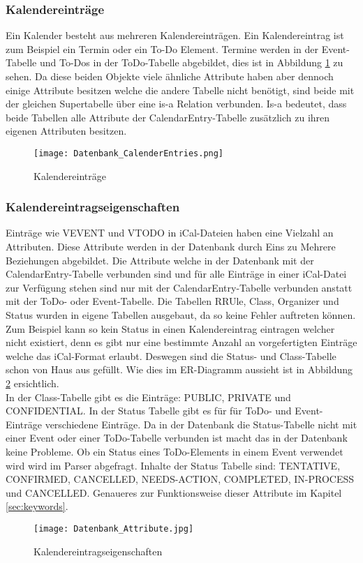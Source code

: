 \subsubsection*{Kalendereinträge}
\label{ref:kalenderEintraege}
Ein Kalender besteht aus mehreren Kalendereinträgen. Ein Kalendereintrag ist zum Beispiel ein Termin oder ein To-Do Element. Termine werden in der Event-Tabelle und To-Dos in der ToDo-Tabelle abgebildet, dies ist in Abbildung \ref{fig:calendarEntries} zu sehen. Da diese beiden Objekte viele ähnliche Attribute haben aber dennoch einige Attribute besitzen welche die andere Tabelle nicht benötigt, sind beide mit der gleichen Supertabelle über eine is-a Relation verbunden. Is-a bedeutet, dass beide Tabellen alle Attribute der CalendarEntry-Tabelle zusätzlich zu ihren eigenen Attributen besitzen.
\begin{figure}[H]
	\texttt{[image: Datenbank\_CalenderEntries.png]}
    \caption{Kalendereinträge}
    \label{fig:calendarEntries}
\end{figure}

\subsubsection*{Kalendereintragseigenschaften}
\label{ref:kalendereintragseigenschaften}
Einträge wie VEVENT und VTODO in iCal-Dateien haben eine Vielzahl an Attributen. Diese Attribute werden in der Datenbank durch Eins zu Mehrere Beziehungen abgebildet. Die Attribute welche in der Datenbank mit der CalendarEntry-Tabelle verbunden sind und für alle Einträge in einer iCal-Datei zur Verfügung stehen sind nur mit der CalendarEntry-Tabelle verbunden anstatt mit der ToDo- oder Event-Tabelle. Die Tabellen RRUle, Class, Organizer und Status wurden in eigene Tabellen ausgebaut, da so keine Fehler auftreten können. Zum Beispiel kann so kein Status in einen Kalendereintrag eintragen welcher nicht existiert, denn es gibt nur eine bestimmte Anzahl an vorgefertigten Einträge welche das iCal-Format erlaubt. Deswegen sind die Status- und Class-Tabelle schon von Haus aus gefüllt. Wie dies im ER-Diagramm aussieht ist in Abbildung \ref{fig:kalendereintragseigenschaften} ersichtlich.\\
In der Class-Tabelle gibt es die Einträge: PUBLIC, PRIVATE und CONFIDENTIAL. In der Status Tabelle gibt es für für ToDo- und Event-Einträge verschiedene Einträge. Da in der Datenbank die Status-Tabelle nicht mit einer Event oder einer ToDo-Tabelle verbunden ist macht das in der Datenbank keine Probleme. Ob ein Status eines ToDo-Elements in einem Event verwendet wird wird im Parser abgefragt. Inhalte der Status Tabelle sind: TENTATIVE, CONFIRMED, CANCELLED, NEEDS-ACTION, COMPLETED, IN-PROCESS und CANCELLED. Genaueres zur Funktionsweise dieser Attribute im Kapitel \ref{sec:keywords}.
\begin{figure}[H]
	\texttt{[image: Datenbank\_Attribute.jpg]}
    \caption{Kalendereintragseigenschaften}
    \label{fig:kalendereintragseigenschaften}
\end{figure}

